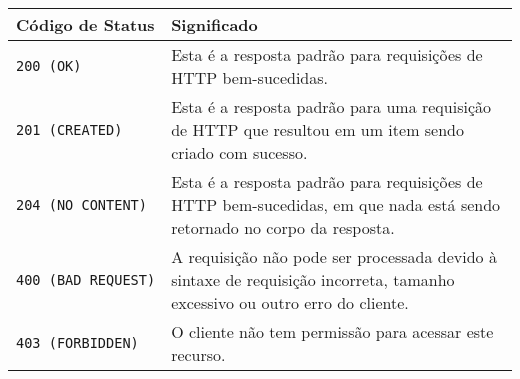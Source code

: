 \documentclass[12pt, a4paper
]{article}
\begin{document}
\begin{longtable}[]{@{}ll@{}}
\toprule
\begin{minipage}[b]{0.47\columnwidth}\raggedright
Código de Status\strut
\end{minipage} & \begin{minipage}[b]{0.47\columnwidth}\raggedright
Significado\strut
\end{minipage}\tabularnewline
\midrule
\endhead
\begin{minipage}[t]{0.47\columnwidth}\raggedright
\texttt{200\ (OK)}\strut
\end{minipage} & \begin{minipage}[t]{0.47\columnwidth}\raggedright
Esta é a resposta padrão para requisições de HTTP bem-sucedidas.\strut
\end{minipage}\tabularnewline
\begin{minipage}[t]{0.47\columnwidth}\raggedright
\texttt{201\ (CREATED)}\strut
\end{minipage} & \begin{minipage}[t]{0.47\columnwidth}\raggedright
Esta é a resposta padrão para uma requisição de HTTP que resultou em um
item sendo criado com sucesso.\strut
\end{minipage}\tabularnewline
\begin{minipage}[t]{0.47\columnwidth}\raggedright
\texttt{204\ (NO\ CONTENT)}\strut
\end{minipage} & \begin{minipage}[t]{0.47\columnwidth}\raggedright
Esta é a resposta padrão para requisições de HTTP bem-sucedidas, em que
nada está sendo retornado no corpo da resposta.\strut
\end{minipage}\tabularnewline
\begin{minipage}[t]{0.47\columnwidth}\raggedright
\texttt{400\ (BAD\ REQUEST)}\strut
\end{minipage} & \begin{minipage}[t]{0.47\columnwidth}\raggedright
A requisição não pode ser processada devido à sintaxe de requisição
incorreta, tamanho excessivo ou outro erro do cliente.\strut
\end{minipage}\tabularnewline
\begin{minipage}[t]{0.47\columnwidth}\raggedright
\texttt{403\ (FORBIDDEN)}\strut
\end{minipage} & \begin{minipage}[t]{0.47\columnwidth}\raggedright
O cliente não tem permissão para acessar este recurso.\strut
\end{minipage}\tabularnewline

\end{longtable}
\end{document}
